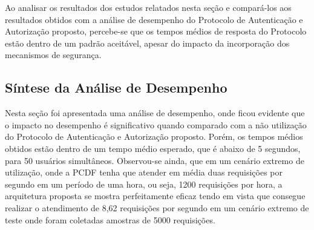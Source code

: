 

Ao analisar os resultados dos estudos relatados nesta seção e compará-los aos resultados obtidos com a análise de desempenho do Protocolo de Autenticação e Autorização proposto, percebe-se que os tempos médios de resposta do Protocolo estão dentro de um padrão aceitável, apesar do impacto da incorporação dos mecanismos de segurança.

\subsection{S\'{i}ntese da An\'{a}lise de Desempenho}

Nesta seção foi apresentada uma análise de desempenho, onde ficou evidente que o impacto no desempenho é significativo quando comparado com a não utilização do Protocolo de Autenticação e Autorização proposto. Porém, os tempos médios obtidos estão dentro de um tempo médio esperado, que é abaixo de 5 segundos, para 50 usuários simultâneos. Observou-se ainda, que em um cenário extremo de utilização, onde a PCDF tenha que atender em média duas requisições por segundo em um período de uma hora, ou seja, 1200 requisições por hora, a arquitetura proposta se mostra perfeitamente eficaz tendo em vista que consegue realizar o atendimento de 8,62 requisições por segundo em um cenário extremo de teste onde foram coletadas amostras de 5000 requisições.
